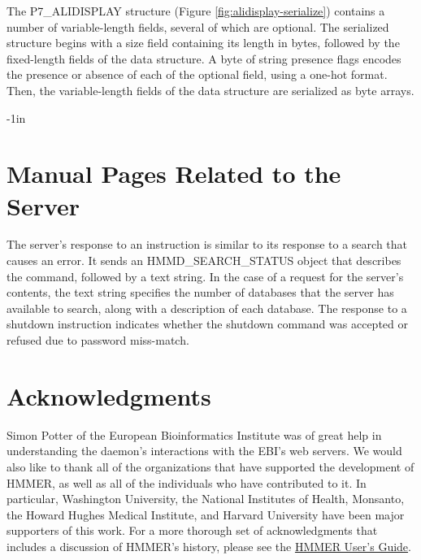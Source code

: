 \documentclass[notoc,justified,openany]{tufte-book}    %
\begin{document}
The {P7\_ALIDISPLAY} structure (Figure \ref{fig:alidisplay-serialize}) contains a number of variable-length fields, several of which are optional.  The serialized structure begins with a size field containing its length in bytes, followed by the fixed-length fields of the data structure.  A byte of string presence flags encodes the presence or absence of each of the optional field, using a one-hot format.  Then, the variable-length fields of the data structure are serialized as byte arrays.

\begin{adjustwidth}{}{-1in}   
\chapter{Manual Pages Related to the Server}

\end{adjustwidth}

The server's response to an instruction is similar to its response to a search that causes an error.  It sends an {HMMD\_SEARCH\_STATUS} object that describes the command, followed by a text string.  In the case of a request for the server's contents, the text string specifies the number of databases that the server has available to search, along with a description of each database.  The response to a shutdown instruction indicates whether the shutdown command was accepted or refused due to password miss-match.


\chapter{Acknowledgments}
Simon Potter of the European Bioinformatics Institute was of great help in understanding the daemon's interactions with the EBI's web servers.  We would also like to thank all of the organizations that have supported the development of HMMER, as well as all of the individuals who have contributed to it. In particular, Washington University, the National Institutes of Health, Monsanto, the Howard Hughes Medical Institute, and Harvard University have been major supporters of this work.  For a more thorough set of acknowledgments that includes a discussion of HMMER's history, please see the \underline{HMMER User's Guide}.

\label{manualend}

% 
\end{document}
